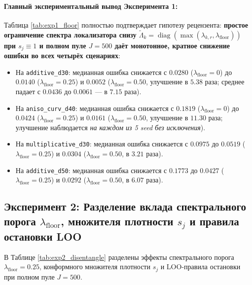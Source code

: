 \documentclass[11pt,a4paper]{article}
\DeclareMathOperator{\diag}{diag}
\theoremstyle{definition}
\theoremstyle{remark}
\begin{document}
\paragraph{Главный экспериментальный вывод Эксперимента 1:}
Таблица \ref{tab:exp1_floor} полностью подтверждает гипотезу рецензента: \textbf{простое ограничение спектра локализатора снизу $\widetilde{\Lambda}_k = \diag(\max(\lambda_{k,r}, \lambda_{\mathrm{floor}}))$ при $s_j \equiv 1$ и полном пуле $J = 500$ даёт монотонное, кратное снижение ошибки во всех четырёх сценариях}:
\begin{itemize}
    \item На \texttt{additive\_d30}: медианная ошибка снижается с $0.0280$ ($\lambda_{\mathrm{floor}}=0$) до $0.0140$ ($\lambda_{\mathrm{floor}}=0.25$) и $\mathbf{0.0052}$ ($\lambda_{\mathrm{floor}}=0.50$, улучшение в $\mathbf{5.38}$ раза; среднее падает с $0.0436$ до $\mathbf{0.0061}$ --- в $\mathbf{7.15}$ раза).
    \item На \texttt{aniso\_curv\_d40}: медианная ошибка снижается с $0.1819$ ($\lambda_{\mathrm{floor}}=0$) до $0.0424$ ($\lambda_{\mathrm{floor}}=0.25$) и $\mathbf{0.0161}$ ($\lambda_{\mathrm{floor}}=0.50$, улучшение в $\mathbf{11.30}$ раза; улучшение наблюдается \emph{на каждом из 5 seed без исключения}).
    \item На \texttt{multiplicative\_d30}: медианная ошибка снижается с $0.0975$ до $0.0519$ ($\lambda_{\mathrm{floor}}=0.25$) и $\mathbf{0.0304}$ ($\lambda_{\mathrm{floor}}=0.50$, в $\mathbf{3.21}$ раза).
    \item На \texttt{additive\_d50}: медианная ошибка снижается с $0.1773$ до $0.0427$ ($\lambda_{\mathrm{floor}}=0.25$) и $\mathbf{0.0292}$ ($\lambda_{\mathrm{floor}}=0.50$, в $\mathbf{6.07}$ раза).
\end{itemize}

\subsection{Эксперимент 2: Разделение вклада спектрального порога $\lambda_{\mathrm{floor}}$, множителя плотности $s_j$ и правила остановки LOO}

В Таблице \ref{tab:exp2_disentangle} разделены эффекты спектрального порога $\lambda_{\mathrm{floor}} = 0.25$, конформного множителя плотности $s_j$ и LOO-правила остановки при полном пуле $J = 500$.
\end{document}
